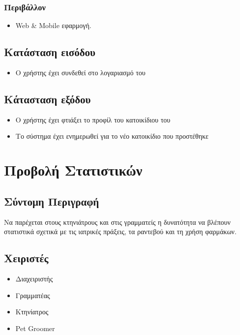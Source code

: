 \documentclass[12pt,a4paper,twoside]{book}
\begin{document}
\subsubsection{Περιβάλλον}
\begin{itemize}
  \item Web \& Mobile εφαρμογή.
\end{itemize}

\subsection{Κατάσταση εισόδου} %
\begin{itemize}
  \item Ο χρήστης έχει συνδεθεί στο λογαριασμό του %
\end{itemize}

\subsection{Κάτασταση εξόδου} %
\begin{itemize}
  \item Ο χρήστης έχει φτιάξει το προφίλ του κατοικίδιου του %
  \item Το σύστημα έχει ενημερωθεί για το νέο κατοικίδιο που προστέθηκε %
\end{itemize}

\section{Προβολή Στατιστικών}

\subsection{Σύντομη Περιγραφή}
Να παρέχεται στους κτηνιάτρους και στις γραμματείς η δυνατότητα να βλέπουν στατιστικά σχετικά με τις ιατρικές πράξεις, τα ραντεβού και τη χρήση φαρμάκων. %

\subsection{Χειριστές}
\begin{itemize}
  \item Διαχειριστής
  \item Γραμματέας
  \item Κτηνίατρος
  \item Pet Groomer
\end{itemize}
\end{document}
